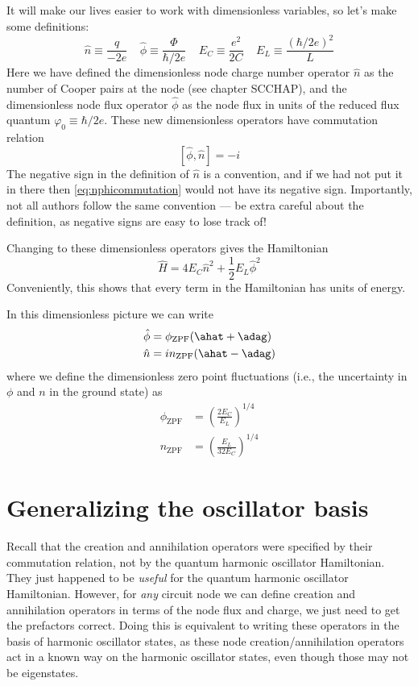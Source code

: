 It will make our lives easier to work with dimensionless variables, so let's make some definitions:
\begin{equation*}
\hat{n} \equiv \frac{\hat{q}}{-2e}  \ \ \ \ \   \hat{\phi} \equiv \frac{\hat{\Phi}}{\hbar/2e} \ \ \ \ \ E_C \equiv \frac{e^2}{2C} \ \ \ \ \ E_L \equiv \frac{(\hbar/2e)^2}{L}
\end{equation*}
Here we have defined the dimensionless node charge number operator $\hat{n}$ as the number of Cooper pairs at the node (see chapter SCCHAP), and the dimensionless node flux operator $\hat{\phi}$ as the node flux in units of the reduced flux quantum $\varphi_0 \equiv \hbar/2e$. These new dimensionless operators have commutation relation
\begin{equation}
\label{eq:nphicommutation}
\left[\hat{\phi},\hat{n}\right] = -i
\end{equation}
The negative sign in the definition of $\hat{n}$ is a convention, and if we had not put it in there then \cref{eq:nphicommutation} would not have its negative sign. Importantly, not all authors follow the same convention --- be extra careful about the definition, as negative signs are easy to lose track of!

Changing to these dimensionless operators gives the Hamiltonian
\begin{equation}
\label{eq:LCHamiltoniandimensionless}
\hat{H} = 4E_C \hat{n}^2 +\frac{1}{2}E_L \hat{\phi}^2
\end{equation}
Conveniently, this shows that every term in the Hamiltonian has units of energy.

In this dimensionless picture we can write
\begin{align}
\hat{\phi} &= \phi_\mathrm{ZPF} (\ahat + \adag) \\
\hat{n} &= i n_\mathrm{ZPF} (\ahat - \adag)
\end{align}
where we define the dimensionless zero point fluctuations (i.e., the uncertainty in $\phi$ and $n$ in the ground state) as
\begin{align}
\phi_\mathrm{ZPF} &= \left(\frac{2 E_C}{E_L}\right)^{1/4} \\
n_\mathrm{ZPF} &= \left(\frac{E_L}{32 E_C}\right)^{1/4}
\end{align}

\section{Generalizing the oscillator basis}
Recall that the creation and annihilation operators were specified by their commutation relation, not by the quantum harmonic oscillator Hamiltonian. They just happened to be \textit{useful} for the quantum harmonic oscillator Hamiltonian. However, for \textit{any} circuit node we can define creation and annihilation operators in terms of the node flux and charge, we just need to get the prefactors correct. Doing this is equivalent to writing these operators in the basis of harmonic oscillator states, as these node creation/annihilation operators act in a known way on the harmonic oscillator states, even though those may not be eigenstates. 

